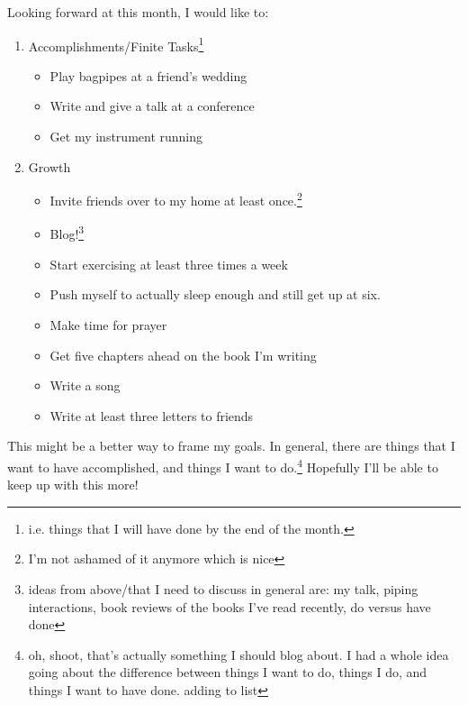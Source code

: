 \documentclass[12pt]{article}[titlepage]
\renewcommand{\,}{\textsuperscript{,}}
\begin{document}
Looking forward at this month, I would like to:
\begin{enumerate}
\item Accomplishments/Finite Tasks\footnote{i.e. things that I will have done by the end of the month.}
\begin{itemize}
\item Play bagpipes at a friend's wedding
\item Write and give a talk at a conference
\item Get my instrument running
\end{itemize}
\item Growth
\begin{itemize}
\item Invite friends over to my home at least once.\footnote{I'm not ashamed of it anymore which is nice}
\item Blog!\footnote{ideas from above/that I need to discuss in general are: my talk, piping interactions, book reviews of the books I've read recently, do versus have done}
\item Start exercising at least three times a week
\item Push myself to actually sleep enough and still get up at six.
\item Make time for prayer
\item Get five chapters ahead on the book I'm writing
\item Write a song
\item Write at least three letters to friends
\end{itemize}
\end{enumerate}

This might be a better way to frame my goals.
In general, there are things that I want to have accomplished, and things I want to do.\footnote{oh, shoot, that's actually something I should blog about. I had a whole idea going about the difference between things I want to do, things I do, and things I want to have done. adding to list}
Hopefully I'll be able to keep up with this more!
\end{document}
